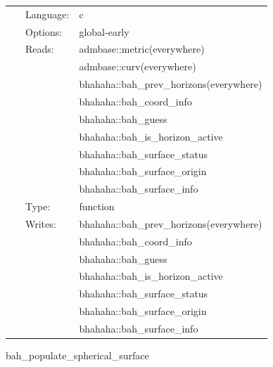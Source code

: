  \begin{tabular*}{160mm}{cll} 
~ & Language:  & c \\ 
~ & Options:  & global-early \\ 
~ & Reads:  & admbase::metric(everywhere) \\ 
~& ~ &admbase::curv(everywhere)\\ 
~& ~ &bhahaha::bah\_prev\_horizons(everywhere)\\ 
~& ~ &bhahaha::bah\_coord\_info\\ 
~& ~ &bhahaha::bah\_guess\\ 
~& ~ &bhahaha::bah\_is\_horizon\_active\\ 
~& ~ &bhahaha::bah\_surface\_status\\ 
~& ~ &bhahaha::bah\_surface\_origin\\ 
~& ~ &bhahaha::bah\_surface\_info\\ 
~ & Type:  & function \\ 
~ & Writes:  & bhahaha::bah\_prev\_horizons(everywhere) \\ 
~& ~ &bhahaha::bah\_coord\_info\\ 
~& ~ &bhahaha::bah\_guess\\ 
~& ~ &bhahaha::bah\_is\_horizon\_active\\ 
~& ~ &bhahaha::bah\_surface\_status\\ 
~& ~ &bhahaha::bah\_surface\_origin\\ 
~& ~ &bhahaha::bah\_surface\_info\\ 
\end{tabular*} 


\vspace{5mm}


\hspace{5mm} bah\_populate\_spherical\_surface 

\hspace{5mm}{\it populate sphericalsurface with bhahaha horizon data } 


\hspace{5mm}

